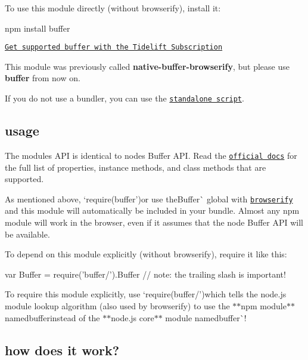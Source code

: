 To use this module directly (without browserify), install it\+:


\begin{DoxyCode}
npm install buffer
\end{DoxyCode}


\href{https://tidelift.com/subscription/pkg/npm-buffer?utm_source=npm-buffer&utm_medium=referral&utm_campaign=readme}{\tt Get supported buffer with the Tidelift Subscription}

This module was previously called {\bfseries native-\/buffer-\/browserify}, but please use {\bfseries buffer} from now on.

If you do not use a bundler, you can use the \href{https://bundle.run/buffer}{\tt standalone script}.

\subsection*{usage}

The module\textquotesingle{}s A\+PI is identical to node\textquotesingle{}s {\ttfamily Buffer} A\+PI. Read the \href{https://nodejs.org/api/buffer.html}{\tt official docs} for the full list of properties, instance methods, and class methods that are supported.

As mentioned above, `require(\textquotesingle{}buffer'){\ttfamily or use the}Buffer\`{} global with \href{http://browserify.org}{\tt browserify} and this module will automatically be included in your bundle. Almost any npm module will work in the browser, even if it assumes that the node {\ttfamily Buffer} A\+PI will be available.

To depend on this module explicitly (without browserify), require it like this\+:


\begin{DoxyCode}
var Buffer = require('buffer/').Buffer  // note: the trailing slash is important!
\end{DoxyCode}


To require this module explicitly, use `require(\textquotesingle{}buffer/'){\ttfamily which tells the node.\+js module lookup algorithm (also used by browserify) to use the $\ast$$\ast$npm module$\ast$$\ast$ named}buffer{\ttfamily  instead of the $\ast$$\ast$node.js core$\ast$$\ast$ module named}buffer\`{}!

\subsection*{how does it work?}

